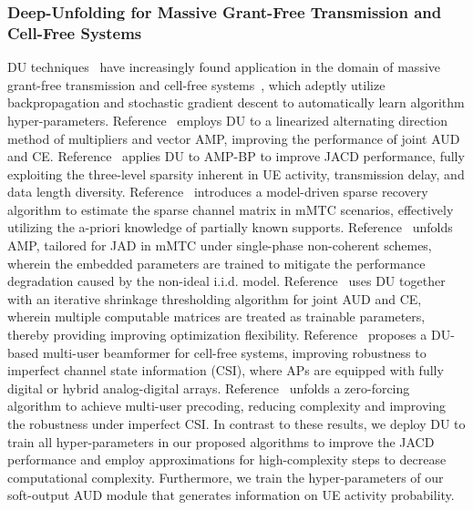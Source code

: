 \subsubsection{Deep-Unfolding for  Massive Grant-Free Transmission and Cell-Free Systems}
%
DU techniques~\cite{Balatsoukas2019deep, hershey2014deep, Jagannath2021redefining, Ye2021deep} have increasingly found application in the domain of massive grant-free transmission and cell-free systems~\cite{Johnston2022model,bai2023deep, Bai2022prior, Ma2023model,shi2020sparse,gao2023hybrid, Liu2022model}, which adeptly utilize backpropagation and stochastic gradient descent to automatically learn algorithm hyper-parameters. 
%
Reference~\cite{Johnston2022model} employs DU to a linearized alternating direction method of multipliers and vector AMP, improving the performance of joint AUD and CE.
%
Reference~\cite{bai2023deep} applies DU to AMP-BP to improve JACD performance, fully exploiting the three-level sparsity inherent in UE activity, transmission delay, and data length diversity.
%
Reference~\cite{Bai2022prior} introduces a model-driven sparse recovery algorithm to estimate the sparse channel matrix in mMTC scenarios, effectively utilizing the a-priori knowledge of partially known supports.
%
Reference~\cite{Ma2023model} unfolds AMP, tailored for JAD in mMTC under single-phase non-coherent schemes, wherein the embedded parameters are trained to mitigate the performance degradation caused by the non-ideal i.i.d. model.
%
Reference~\cite{shi2020sparse} uses DU together with an iterative shrinkage thresholding algorithm for joint AUD and CE, wherein multiple computable matrices are treated as trainable parameters, thereby providing improving optimization flexibility.
%
Reference~\cite{gao2023hybrid} proposes a DU-based multi-user beamformer for cell-free systems, improving robustness to imperfect channel state information (CSI), where APs are equipped with fully digital or hybrid analog-digital arrays.
%
Reference~\cite{Liu2022model} unfolds a zero-forcing algorithm to achieve multi-user precoding, reducing complexity and improving the robustness under imperfect CSI.
%
In contrast to these results, we deploy DU to train all hyper-parameters in our proposed algorithms to improve the JACD performance and employ approximations for high-complexity steps to decrease computational complexity.
%
Furthermore, we train the hyper-parameters of our soft-output AUD module that generates information on UE activity probability.